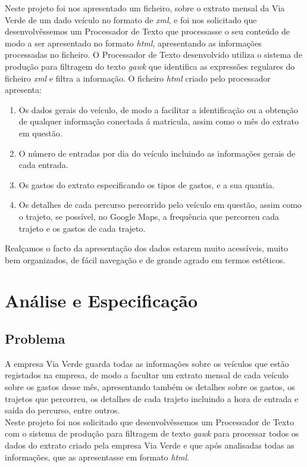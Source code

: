 \documentclass{report}
\begin{document}
	Neste projeto foi nos apresentado um ficheiro, sobre o extrato mensal da Via Verde de um dado veículo no formato de \textit{xml}, e foi nos solicitado que desenvolvêssemos um Processador de Texto que processasse o seu conteúdo de modo a ser apresentado no formato \textit{html}, apresentando as informações processadas no ficheiro. O Processador de Texto desenvolvido utiliza o sistema de produção para filtragem do texto \textit{gawk} que identifica as expressões regulares do ficheiro \textit{xml} e filtra a informação. O ficheiro \textit{html} criado pelo processador apresenta:\\
\begin{enumerate}[1.]
  \item Os dados gerais do veículo, de modo a facilitar a identificação ou a obtenção de qualquer informação conectada á matricula, assim como o mês do extrato em questão.\\
  \item O número de entradas por dia do veículo incluindo as informações gerais de cada entrada.\\
  \item Os gastos do extrato especificando os tipos de gastos, e a sua quantia.\\
	\item Os detalhes de cada percurso percorrido pelo veículo em questão, assim como o trajeto, se possível, no Google Maps, a frequência que percorreu cada trajeto e os gastos de cada trajeto.\\
\end{enumerate}
	Realçamos o facto da apresentação dos dados estarem muito acessíveis, muito bem organizados, de fácil navegação e de grande agrado em termos estéticos.\\





\chapter{Análise e Especificação} \label{ae}
\section{Problema}
	A empresa Via Verde guarda todas as informações sobre os veículos que estão registados na empresa, de modo a facultar um extrato mensal de cada veículo sobre os gastos desse mês, apresentando também os detalhes sobre os gastos, os trajetos que percorreu, os detalhes de cada trajeto incluindo a hora de entrada e saída do percurso, entre outros.\\
	Neste projeto foi nos solicitado que desenvolvêssemos um Processador de Texto com o sistema de produção para filtragem de texto \textit{gawk} para processar todos os dados do extrato criado pela empresa Via Verde e que após analisadas todas as informações, que as apresentasse em formato \textit{html}.\\
\end{document}
